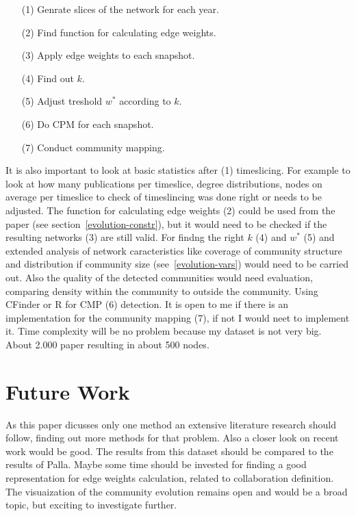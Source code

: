 \documentclass[runningheads,a4paper]{llncs}
\begin{document}
\begin{enumerate}
\small
	\item[(1)] Genrate slices of the network for each year.
	\item[(2)] Find function for calculating edge weights.
	\item[(3)] Apply edge weights to each snapshot.
	\item[(4)] Find out $k$.
	\item[(5)] Adjust treshold $w^*$ according to $k$.	
	\item[(6)] Do CPM for each snapshot.
	\item[(7)] Conduct community mapping.
\end{enumerate}

It is also important to look at basic statistics after (1) timeslicing. For example to look at how many publications per timeslice, degree distributions, nodes on average per timeslice to check of timeslincing was done right or needs to be adjusted.
The function for calculating edge weights (2) could be used from the paper (see section~\ref{evolution-constr}), but it would need to be checked if the resulting networks (3) are still valid.
For findng the right $k$ (4) and $w^*$ (5) and extended analysis of network caracteristics like coverage of community structure and distribution if community size (see~\ref{evolution-vars}) would need to be carried out. Also the quality of the detected communities would need evaluation, comparing density within the community to outside the community. Using CFinder or R for CMP (6) detection. It is open to me if there is an implementation for the community mapping (7), if not I would neet to implement it.
Time complexity will be no problem because my dataset is not very big. About 2.000 paper resulting in about 500 nodes.

\section{Future Work}
As this paper dicusses only one method an extensive literature research should follow, finding out more methods for that problem. Also a closer look on recent work would be good. The results from this dataset should be compared to the results of Palla. Maybe some time should be invested for finding a good representation for edge weights calculation, related to collaboration definition. The visuaization of the community evolution remains open and would be a broad topic, but exciting to investigate further.

{
	
	
}
\end{document}
